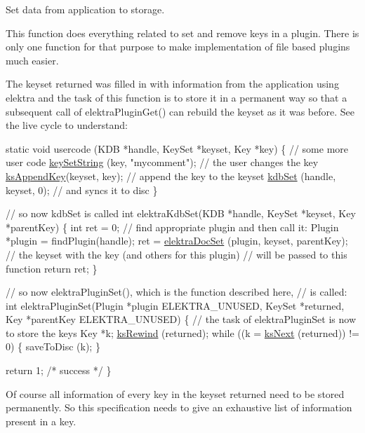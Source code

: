 Set data from application to storage. 

This function does everything related to set and remove keys in a plugin. There is only one function for that purpose to make implementation of file based plugins much easier.

The keyset {\ttfamily returned} was filled in with information from the application using elektra and the task of this function is to store it in a permanent way so that a subsequent call of elektra\+Plugin\+Get() can rebuild the keyset as it was before. See the live cycle to understand\+:


\begin{DoxyCodeInclude}
\textcolor{keyword}{static} \textcolor{keywordtype}{void} usercode (KDB *handle, KeySet *keyset, Key *key)
\{
        \textcolor{comment}{// some more user code}
        \hyperlink{group__keyvalue_ga622bde1eb0e0c4994728331326340ef2}{keySetString} (key, \textcolor{stringliteral}{"mycomment"}); \textcolor{comment}{// the user changes the key}
        \hyperlink{group__keyset_gaa5a1d467a4d71041edce68ea7748ce45}{ksAppendKey}(keyset, key); \textcolor{comment}{// append the key to the keyset}
        \hyperlink{group__kdb_ga11436b058408f83d303ca5e996832bcf}{kdbSet} (handle, keyset, 0); \textcolor{comment}{// and syncs it to disc}
\}

\textcolor{comment}{// so now kdbSet is called}
\textcolor{keywordtype}{int} elektraKdbSet(KDB *handle, KeySet *keyset, Key *parentKey)
\{
        \textcolor{keywordtype}{int} ret = 0;
        \textcolor{comment}{// find appropriate plugin and then call it:}
        Plugin *plugin = findPlugin(handle);
        ret = \hyperlink{group__plugin_gae65781a1deb34efc79c8cb9d9174842c}{elektraDocSet} (plugin, keyset, parentKey);
        \textcolor{comment}{// the keyset with the key (and others for this plugin)}
        \textcolor{comment}{// will be passed to this function}
        \textcolor{keywordflow}{return} ret;
\}

\textcolor{comment}{// so now elektraPluginSet(), which is the function described here,}
\textcolor{comment}{// is called:}
\textcolor{keywordtype}{int} elektraPluginSet(Plugin *plugin ELEKTRA\_UNUSED, KeySet *returned, Key *parentKey ELEKTRA\_UNUSED)
\{
        \textcolor{comment}{// the task of elektraPluginSet is now to store the keys}
        Key *k;
        \hyperlink{group__keyset_gabe793ff51f1728e3429c84a8a9086b70}{ksRewind} (returned);
        \textcolor{keywordflow}{while} ((k = \hyperlink{group__keyset_ga317321c9065b5a4b3e33fe1c399bcec9}{ksNext} (returned)) != 0)
        \{
                saveToDisc (k);
        \}

        \textcolor{keywordflow}{return} 1; \textcolor{comment}{/* success */}
\}
\end{DoxyCodeInclude}
 Of course all information of every key in the keyset {\ttfamily returned} need to be stored permanently. So this specification needs to give an exhaustive list of information present in a key.

